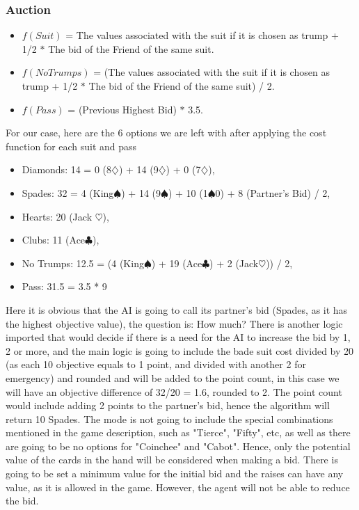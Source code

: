 \begin{frame}\frametitle{Auction}

    \begin{itemize}
    \item $f(Suit)$ = The values associated with the suit if it is chosen as trump + 1/2 $*$ The bid of the Friend of the same suit.
    \item $f(NoTrumps)$ = (The values associated with the suit if it is chosen as trump + 1/2 $*$ The bid of the Friend of the same suit) / 2.
    \item $f(Pass)$ = (Previous Highest Bid) $*$ 3.5.
    \end{itemize}



\end{frame}

For our case, here are the 6 options we are left with after applying the cost function for each suit and pass
\begin{itemize}
    \item Diamonds:  14 = 0 (8$\diamondsuit$) + 14 (9$\diamondsuit$) + 0 (7$\diamondsuit$),
    \item Spades: 32 = 4 (King$\spadesuit$) + 14 (9$\spadesuit$) + 10 (1$\spadesuit$0) + 8 (Partner’s Bid) / 2,
    \item Hearts: 20 (Jack $\heartsuit$),
    \item Clubs: 11 (Ace$\clubsuit$),
    \item No Trumps: 12.5 = (4 (King$\spadesuit$) + 19 (Ace$\clubsuit$) + 2 (Jack$\heartsuit$)) / 2,
    \item Pass: 31.5 = 3.5 * 9
\end{itemize}

Here it is obvious that the AI
is going to call its partner's bid (Spades, as it has the highest objective value), the question is: How much? There is another logic
imported that would decide if there is a need for the AI to increase the bid by 1, 2 or
more, and the main logic is going to include the bade suit cost divided by 20 (as each 10 objective equals to 1 point, and divided with another 2 for emergency)
and rounded and will be added to the point
count, in this case we will have an objective difference of 32/20 = 1.6, rounded to 2. The point count would include adding 2 points to the partner's bid,
hence the algorithm will return 10 Spades. The mode is not going to include the special combinations mentioned
in the game description, such as "Tierce", "Fifty", etc, as well as there are going to be no options for "Coinchee" and "Cabot".
Hence, only the potential value of the cards in the hand will be considered when making a bid.
There is going to be set a minimum value for the initial bid and
the raises can have any value, as it is allowed in the game. However, the agent will not be able to reduce the bid.


